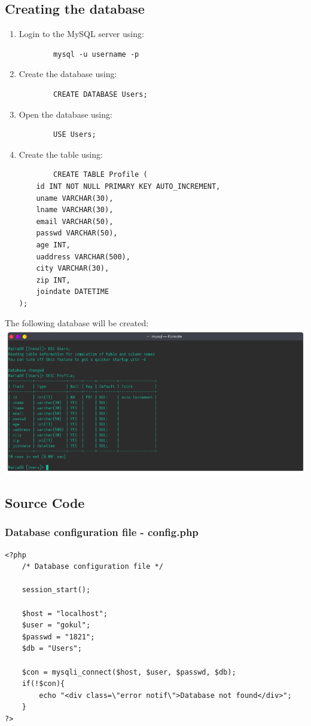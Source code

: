 \documentclass{article}
\begin{document}
\newpage

\subsection{Creating the database}
\begin{enumerate}
	\item Login to the MySQL server using: \begin{verbatim}
		mysql -u username -p
	\end{verbatim}

	\item Create the database using: \begin{verbatim}
		CREATE DATABASE Users;
	\end{verbatim}

	\item Open the database using: \begin{verbatim}
		USE Users;
	\end{verbatim}

	\item Create the table using: \begin{verbatim}
		CREATE TABLE Profile (
    id INT NOT NULL PRIMARY KEY AUTO_INCREMENT,
    uname VARCHAR(30),
    lname VARCHAR(30),
    email VARCHAR(50),
    passwd VARCHAR(50),
    age INT,
    uaddress VARCHAR(500),
    city VARCHAR(30),
    zip INT,
    joindate DATETIME
);
	\end{verbatim}
\end{enumerate}
The following database will be created:\newline
\includegraphics[width=1\textwidth]{img/p25/ss3.png}

\newpage

\subsection{Source Code}
\subsubsection{Database configuration file - config.php}
\begin{verbatim}
<?php
    /* Database configuration file */
    
    session_start();
    
    $host = "localhost";
    $user = "gokul";
    $passwd = "1821";
    $db = "Users";

    $con = mysqli_connect($host, $user, $passwd, $db);
    if(!$con){
        echo "<div class=\"error notif\">Database not found</div>";
    }
?>
\end{verbatim}
\end{document}
